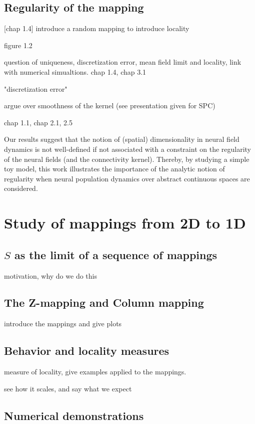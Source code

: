 \documentclass[NETN,manuscript]{stjour-new}
\begin{document}
\subsection{Regularity of the mapping}

[chap 1.4] introduce a random mapping to introduce locality

figure 1.2

question of uniqueness, discretization error, mean field limit and locality, link with numerical simualtions. chap 1.4, chap 3.1

"discretization error"

argue over smoothness of the kernel (see presentation given for SPC)


chap 1.1, chap 2.1, 2.5


Our results suggest that the notion of (spatial) dimensionality in neural field dynamics is not well-defined if not associated with a constraint on the regularity of the neural fields (and the connectivity kernel). Thereby, by studying a simple toy model, this work illustrates the importance of the analytic notion of regularity when neural population dynamics over abstract continuous spaces are considered. 

\section{Study of mappings from 2D to 1D}

\subsection{$S$ as the limit of a sequence of mappings}

motivation, why do we do this

\subsection{The Z-mapping and Column mapping}

introduce the mappings and give plots

\subsection{Behavior and locality measures}

measure of locality, give examples applied to the mappings.

see how it scales, and say what we expect

\subsection{Numerical demonstrations}
\end{document}
